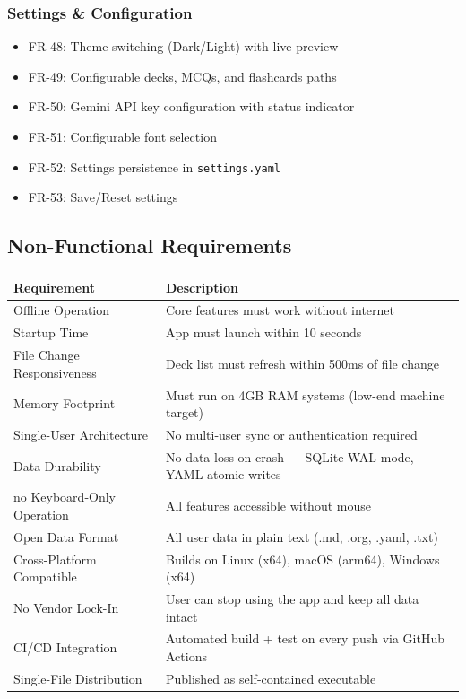 \documentclass[14pt]{article}
\begin{document}
\subsubsection{Settings \& Configuration}
\label{sec:orgf9d55e1}
\begin{itemize}
\item FR-48: Theme switching (Dark/Light) with live preview
\item FR-49: Configurable decks, MCQs, and flashcards paths
\item FR-50: Gemini API key configuration with status indicator
\item FR-51: Configurable font selection
\item FR-52: Settings persistence in \texttt{settings.yaml}
\item FR-53: Save/Reset settings
\end{itemize}
\subsection{Non-Functional Requirements}
\label{sec:orga80af77}
\begin{center}
\begin{tabular}{ll}
Requirement & Description\\
\hline
Offline Operation & Core features must work without internet\\
Startup Time & App must launch within 10 seconds\\
File Change Responsiveness & Deck list must refresh within 500ms of file change\\
Memory Footprint & Must run on 4GB RAM systems (low-end machine target)\\
Single-User Architecture & No multi-user sync or authentication required\\
Data Durability & No data loss on crash — SQLite WAL mode, YAML atomic writes\\
no Keyboard-Only Operation & All features accessible without mouse\\
Open Data Format & All user data in plain text (.md, .org, .yaml, .txt)\\
Cross-Platform Compatible & Builds on Linux (x64), macOS (arm64), Windows (x64)\\
No Vendor Lock-In & User can stop using the app and keep all data intact\\
CI/CD Integration & Automated build + test on every push via GitHub Actions\\
Single-File Distribution & Published as self-contained executable\\
\end{tabular}
\end{center}
\end{document}
